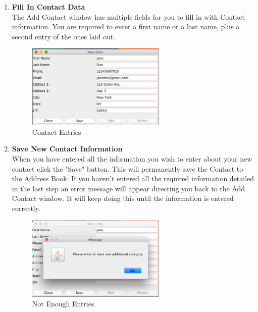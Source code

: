 \documentclass[a4paper, 11pt]{article}
\begin{document}
\begin{enumerate}[label=\textbf{\arabic*})]
    \item{\textbf{Fill In Contact Data}}\\ The Add Contact window has multiple fields for you to fill in with Contact information. You are required to enter a first name or a last name, plus a second entry of the ones laid out.
    
    \begin{figure}[h!]
    \centering
      \includegraphics[width=250]{new_contact_entry.png}
      \caption{Contact Entries}
    \end{figure}
    
    \clearpage
    
    \item{\textbf{Save New Contact Information}}\\ When you have entered all the information you wish to enter about your new contact click the "Save" button. This will permanently save the Contact to the Address Book. If you haven't entered all the required information detailed in the last step an error message will appear directing you back to the Add Contact window. It will keep doing this until the information is entered correctly.
    
    \begin{figure}[h!]
    \centering
      \includegraphics[width=250]{add_entry_error.png}
      \caption{Not Enough Entries}
    \end{figure}
    

\end{enumerate}
\end{document}
